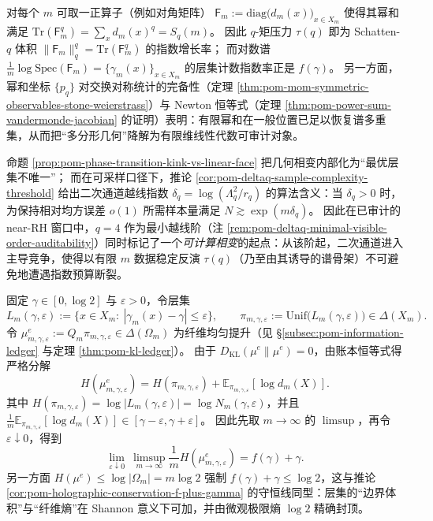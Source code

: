 \begin{remark}\label{rem:pom-matrixization-spectrum-density-schatten-det}
对每个 \(m\) 可取一正算子（例如对角矩阵）
\(
\mathsf F_m:=\mathrm{diag}\bigl(d_m(x)\bigr)_{x\in X_m}
\)
使得其幂和满足
\(
\mathrm{Tr}(\mathsf F_m^q)=\sum_x d_m(x)^q=S_q(m)
\)。
因此 \(q\)-矩压力 \(\tau(q)\) 即为 Schatten-\(q\) 体积 \(\|\mathsf F_m\|_q^q=\mathrm{Tr}(\mathsf F_m^q)\) 的指数增长率；
而对数谱
\(
\frac{1}{m}\log\mathrm{Spec}(\mathsf F_m)=\{\gamma_m(x)\}_{x\in X_m}
\)
的层集计数指数率正是 \(f(\gamma)\)。
另一方面，幂和坐标 \(\{p_q\}\) 对交换对称统计的完备性（定理 \ref{thm:pom-mom-symmetric-observables-stone-weierstrass}）与 Newton 恒等式（定理 \ref{thm:pom-power-sum-vandermonde-jacobian} 的证明）表明：有限幂和在一般位置已足以恢复谱多重集，从而把“多分形几何”降解为有限维线性代数可审计对象。
\end{remark}

\begin{remark}\label{rem:pom-computational-phase-transition-deltaq}
命题 \ref{prop:pom-phase-transition-kink-vs-linear-face} 把几何相变内部化为“最优层集不唯一”；
而在可采样口径下，推论 \ref{cor:pom-deltaq-sample-complexity-threshold} 给出二次通道越线指数
\(\delta_q=\log(\Lambda_q^2/r_q)\) 的算法含义：当 \(\delta_q>0\) 时，为保持相对均方误差 \(o(1)\) 所需样本量满足 \(N\gtrsim \exp(m\delta_q)\)。
因此在已审计的 near-RH 窗口中，\(q=4\) 作为最小越线阶（注 \ref{rem:pom-deltaq-minimal-visible-order-auditability}）同时标记了一个\emph{可计算相变}的起点：从该阶起，二次通道进入主导竞争，使得以有限 \(m\) 数据稳定反演 \(\tau(q)\)（乃至由其诱导的谱骨架）不可避免地遭遇指数预算断裂。
\end{remark}

\begin{remark}\label{rem:pom-layer-set-shannon-holography}
固定 \(\gamma\in[0,\log 2]\) 与 \(\varepsilon>0\)，令层集
\[
L_{m}(\gamma,\varepsilon):=\{x\in X_m:\ |\gamma_m(x)-\gamma|\le \varepsilon\},
\qquad
\pi_{m,\gamma,\varepsilon}:=\mathrm{Unif}\bigl(L_m(\gamma,\varepsilon)\bigr)\in\Delta(X_m).
\]
令 \(\mu^{e}_{m,\gamma,\varepsilon}:=Q_m\pi_{m,\gamma,\varepsilon}\in\Delta(\Omega_m)\) 为纤维均匀提升（见 \S\ref{subsec:pom-information-ledger} 与定理 \ref{thm:pom-kl-ledger}）。
由于 \(D_{\mathrm{KL}}(\mu^{e}\|\mu^{e})=0\)，由账本恒等式得严格分解
\[
H(\mu^{e}_{m,\gamma,\varepsilon})
=H(\pi_{m,\gamma,\varepsilon})+\mathbb{E}_{\pi_{m,\gamma,\varepsilon}}[\log d_m(X)].
\]
其中 \(H(\pi_{m,\gamma,\varepsilon})=\log|L_m(\gamma,\varepsilon)|=\log N_m(\gamma,\varepsilon)\)，并且
\(
\frac1m\mathbb{E}_{\pi_{m,\gamma,\varepsilon}}[\log d_m(X)]\in[\gamma-\varepsilon,\gamma+\varepsilon]
\)。
因此先取 \(m\to\infty\) 的 \(\limsup\)，再令 \(\varepsilon\downarrow 0\)，得到
\[
\lim_{\varepsilon\downarrow 0}\ \limsup_{m\to\infty}\frac{1}{m}H(\mu^{e}_{m,\gamma,\varepsilon})
=f(\gamma)+\gamma.
\]
另一方面 \(H(\mu^{e})\le \log|\Omega_m|=m\log 2\) 强制
\(
f(\gamma)+\gamma\le \log 2
\)，这与推论 \ref{cor:pom-holographic-conservation-f-plus-gamma} 的守恒线同型：层集的“边界体积”与“纤维熵”在 Shannon 意义下可加，并由微观极限熵 \(\log 2\) 精确封顶。
\end{remark}
